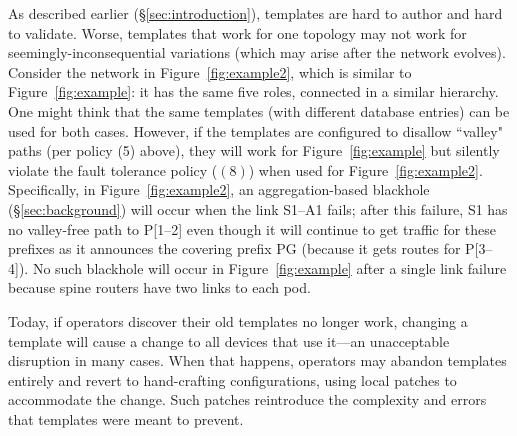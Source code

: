 \documentclass[numbers, 10pt, preprint]{sigplanconf}
\begin{document}

As described earlier (\S\ref{sec:introduction}), templates are hard to author and hard to validate. Worse, templates that work for one topology may not work for seemingly-inconsequential variations (which may arise after the network evolves).
Consider the network in Figure~\ref{fig:example2}, which is similar to Figure~\ref{fig:example}: it has the same five roles, connected in a similar hierarchy. One might think that the same templates (with different database entries) can be used for both cases. However, if the templates are configured to disallow ``valley" paths (per policy (5) above), they will work for Figure~\ref{fig:example} but silently violate the fault tolerance policy ($(8)$) when used for Figure~\ref{fig:example2}.  Specifically, in Figure~\ref{fig:example2}, an aggregation-based blackhole (\S\ref{sec:background}) will occur when the link S1--A1 fails; after this failure, S1 has no valley-free path to P[1--2] even though it will continue to get traffic for these prefixes as it announces the covering prefix PG (because it gets routes for P[3--4]). No such blackhole will occur in Figure~\ref{fig:example} after a single link failure because spine routers have two links to each pod.


Today, if operators discover their old templates no longer work, changing a template will
cause a change to all devices that use it---an unacceptable disruption in many cases.  When that happens, operators may abandon templates entirely and revert to hand-crafting configurations, using local patches to accommodate the change.
Such patches reintroduce the complexity and errors that templates were meant to prevent.
\end{document}
